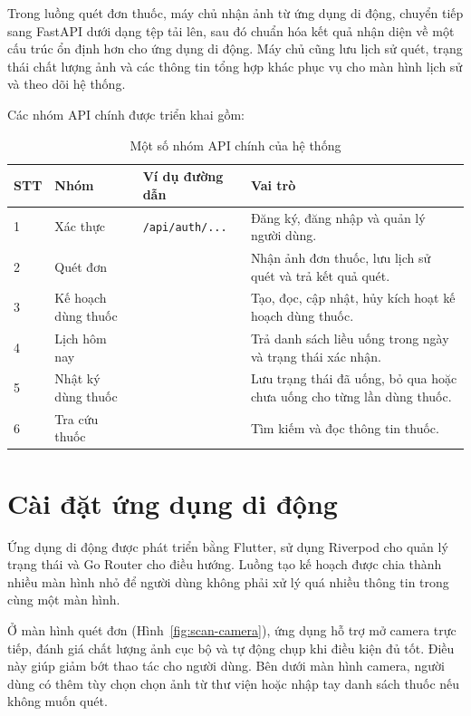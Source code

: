 \documentclass[12pt,a4paper]{report}
\renewcommand{\arraystretch}{1.25}
\begin{document}
Trong luồng quét đơn thuốc, máy chủ nhận ảnh từ ứng dụng di động, chuyển tiếp sang FastAPI dưới dạng tệp tải lên, sau đó chuẩn hóa kết quả nhận diện về một cấu trúc ổn định hơn cho ứng dụng di động. Máy chủ cũng lưu lịch sử quét, trạng thái chất lượng ảnh và các thông tin tổng hợp khác phục vụ cho màn hình lịch sử và theo dõi hệ thống.

Các nhóm API chính được triển khai gồm:

\begin{table}[htbp]
\centering
\caption{Một số nhóm API chính của hệ thống}
\label{tab:api-groups}
{\renewcommand{\arraystretch}{1.4}
\begin{tabularx}{\textwidth}{C{1.2cm}L{3.1cm}L{4.3cm}Y}
\toprule
\textbf{STT} & \textbf{Nhóm} & \textbf{Ví dụ đường dẫn} & \textbf{Vai trò} \\
 & Xác thực & \texttt{/api/auth/...} & Đăng ký, đăng nhập và quản lý người dùng. \\
2 & Quét đơn &  & Nhận ảnh đơn thuốc, lưu lịch sử quét và trả kết quả quét. \\
3 & Kế hoạch dùng thuốc &  & Tạo, đọc, cập nhật, hủy kích hoạt kế hoạch dùng thuốc. \\
4 & Lịch hôm nay &  & Trả danh sách liều uống trong ngày và trạng thái xác nhận. \\
5 & Nhật ký dùng thuốc &  & Lưu trạng thái đã uống, bỏ qua hoặc chưa uống cho từng lần dùng thuốc. \\
6 & Tra cứu thuốc &  & Tìm kiếm và đọc thông tin thuốc. \\
\bottomrule
\end{tabularx}}
\end{table}

\section{Cài đặt ứng dụng di động}

Ứng dụng di động được phát triển bằng Flutter, sử dụng Riverpod cho quản lý trạng thái và Go Router cho điều hướng. Luồng tạo kế hoạch được chia thành nhiều màn hình nhỏ để người dùng không phải xử lý quá nhiều thông tin trong cùng một màn hình.

Ở màn hình quét đơn (Hình~\ref{fig:scan-camera}), ứng dụng hỗ trợ mở camera trực tiếp, đánh giá chất lượng ảnh cục bộ và tự động chụp khi điều kiện đủ tốt. Điều này giúp giảm bớt thao tác cho người dùng. Bên dưới màn hình camera, người dùng có thêm tùy chọn chọn ảnh từ thư viện hoặc nhập tay danh sách thuốc nếu không muốn quét.
\end{document}
